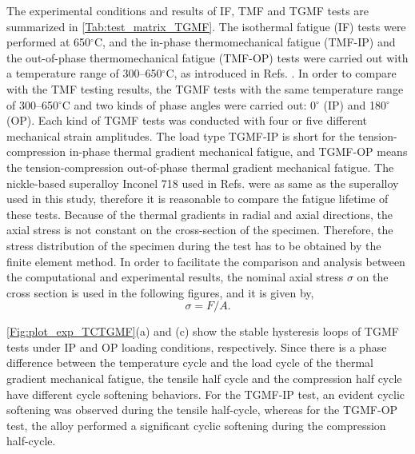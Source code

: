 \documentclass[preprint,5p,twocolumn,11pt,sort&compress]{elsarticle}
\begin{document}
The experimental conditions and results of IF, TMF and TGMF tests are summarized in \autoref{Tab:test_matrix_TGMF}. The isothermal fatigue (IF) tests were performed at 650$^\circ$C, and the in-phase thermomechanical fatigue (TMF-IP) and the out-of-phase thermomechanical fatigue (TMF-OP) tests were carried out with a temperature range of 300–650$^\circ$C, as introduced in Refs. \cite{SUN2019228, SUN201989}. In order to compare with the TMF testing results, the TGMF tests with the same temperature range of 300–650$^\circ$C and two kinds of phase angles were carried out: 0$^\circ$ (IP) and 180$^\circ$ (OP). Each kind of TGMF tests was conducted with four or five different mechanical strain amplitudes. The load type TGMF-IP is short for the tension-compression in-phase thermal gradient mechanical fatigue, and TGMF-OP means the tension-compression out-of-phase thermal gradient mechanical fatigue. The nickle-based superalloy Inconel 718 used in Refs. \cite{SUN2019228, SUN201989} were as same as the superalloy used in this study, therefore it is reasonable to compare the fatigue lifetime of these tests.
Because of the thermal gradients in radial and axial directions, the axial stress is not constant on the cross-section of the specimen.
Therefore, the stress distribution of the specimen during the test has to be obtained by the finite element method.
In order to facilitate the comparison and analysis between the computational and experimental results, the nominal axial stress $\sigma$ on the cross section is used in the following figures, and it is given by,
\[\sigma = F/A.\]

\autoref{Fig:plot_exp_TCTGMF}(a) and (c) show the stable hysteresis loops of TGMF tests under IP and OP loading conditions, respectively.
Since there is a phase difference between the temperature cycle and the load cycle of the thermal gradient mechanical fatigue, the tensile half cycle and the compression half cycle have different cycle softening behaviors.
For the TGMF-IP test, an evident cyclic softening was observed during the tensile half-cycle, whereas for the TGMF-OP test, the alloy performed a significant cyclic softening during the compression half-cycle.
\end{document}
